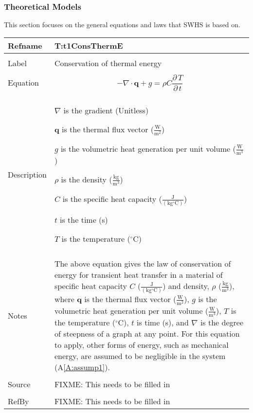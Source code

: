 \documentclass[12pt]{article}
\begin{document}
\subsubsection{Theoretical Models}
\label{Sec:TMs}
This section focuses on the general equations and laws that SWHS is based on.
~\newline
\noindent \begin{minipage}{\textwidth}
\begin{tabular}{p{} p{}}
\toprule \textbf{Refname} & \textbf{T:t1ConsThermE}
\label{T:t1ConsThermE}
\\ \midrule \\
Label & Conservation of thermal energy
\\ \midrule \\
Equation & \begin{dmath}
           -∇\cdot{}\mathbf{q}+g=ρ C \frac{\partial{}\,T}{\partial{}\,t}
           \end{dmath}
\\ \midrule \\
Description & \begin{symbDescription}
              \item{$∇$ is the gradient (Unitless)}
              \item{$\mathbf{q}$ is the thermal flux vector ($\frac{\text{W}}{\text{m}^{2}}$)}
              \item{$g$ is the volumetric heat generation per unit volume ($\frac{\text{W}}{\text{m}^{3}}$)}
              \item{$ρ$ is the density ($\frac{\text{kg}}{\text{m}^{3}}$)}
              \item{$C$ is the specific heat capacity ($\frac{\text{J}}{(\text{kg}{}^{\circ}\text{C})}$)}
              \item{$t$ is the time (s)}
              \item{$T$ is the temperature (${}^{\circ}$C)}
              \end{symbDescription}
\\ \midrule \\
Notes & The above equation gives the law of conservation of energy for transient heat transfer in a material of specific heat capacity $C$ ($\frac{\text{J}}{(\text{kg}{}^{\circ}\text{C})}$) and density, $ρ$ ($\frac{\text{kg}}{\text{m}^{3}}$), where $\mathbf{q}$ is the thermal flux vector ($\frac{\text{W}}{\text{m}^{2}}$), $g$ is the volumetric heat generation per unit volume ($\frac{\text{W}}{\text{m}^{3}}$), $T$ is the temperature (${}^{\circ}$C), $t$ is time (s), and $∇$ is the degree of steepness of a graph at any point. For this equation to apply, other forms of energy, such as mechanical energy, are assumed to be negligible in the system (A\ref{A:assump1}).
\\ \midrule \\
Source & FIXME: This needs to be filled in
\\ \midrule \\
RefBy & FIXME: This needs to be filled in
\\ \bottomrule \end{tabular}
\end{minipage}\\
\end{document}
